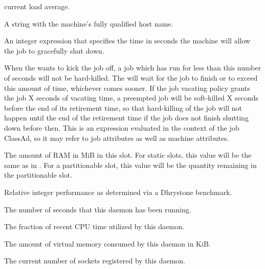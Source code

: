 \begin{description}
current load average.
%
\item[\AdAttr{Machine}:] A string with the machine's fully qualified host name.
%
\item[\AdAttr{MachineMaxVacateTime}:] An integer expression that specifies
the time in seconds the machine will allow the job to gracefully shut
down.
%
\item[\AdAttr{MaxJobRetirementTime}:] When the  wants
to kick the job off, a job which has run for less than this number
of seconds will not be hard-killed.  The  will wait
for the job to finish or to exceed this amount of time, whichever
comes sooner.  If the job vacating policy grants the job X seconds
of vacating time, a preempted job will be soft-killed X seconds
before the end of its retirement time, so that hard-killing of the
job will not happen until the end of the retirement time if the job
does not finish shutting down before then.  This is an expression
evaluated in the context of the job ClassAd, so it may refer to job
attributes as well as machine attributes.
%
\item[\AdAttr{Memory}:] The amount of RAM in MiB in this slot.
For static slots, this value will be the same as in .
For a partitionable slot, this value will be the quantity remaining
in the partitionable slot.
%
\item[\AdAttr{Mips}:] Relative integer performance as determined via a Dhrystone
benchmark.

\item[\AdAttr{MonitorSelfAge}:] The number of seconds that this daemon
  has been running.

\item[\AdAttr{MonitorSelfCPUUsage}:] The fraction of recent CPU time utilized
  by this daemon. 

\item[\AdAttr{MonitorSelfImageSize}:] The amount of virtual memory consumed by
  this daemon in KiB.

\item[\AdAttr{MonitorSelfRegisteredSocketCount}:] The current number of sockets
  registered by this daemon.


\end{description}
